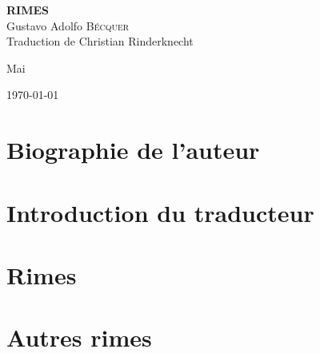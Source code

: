 \documentclass[a4paper,12pt]{book}
\begin{document}
\thispagestyle{empty}

\vspace*{70mm}

\begin{center}
{\Huge\textbf{RIMES}} \\
\bigskip
{\Large Gustavo Adolfo \textsc{Bécquer}} \\
\bigskip
Traduction de Christian Rinderknecht
\end{center}

\bigskip\bigskip\bigskip
\begin{center}
  Mai 
\end{center}

\centerline\today

\cleardoublepage

\frenchspacing  %

\part{Biographie de l'auteur}


\part{Introduction du traducteur}


\part{Rimes}


\part{Autres rimes}


\bigskip

\tableofcontents
\end{document}
